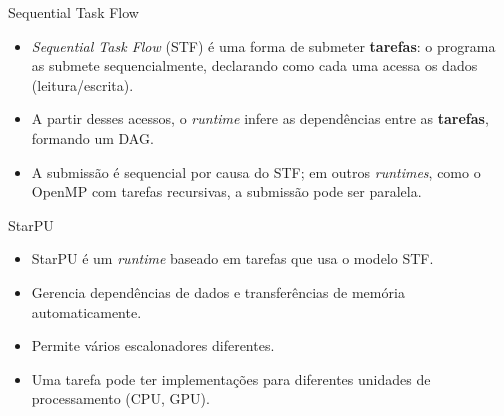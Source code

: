 \documentclass{beamer}
\begin{document}
\begin{frame}{Sequential Task Flow}
  \begin{itemize}
  \item<+-> \textit{Sequential Task Flow} (STF) é uma forma de submeter \textbf{tarefas}: o programa as submete sequencialmente, declarando como cada uma acessa os dados (leitura/escrita).
  \item<+-> A partir desses acessos, o \textit{runtime} infere as dependências entre as \textbf{tarefas}, formando um DAG.
  \item<+-> A submissão é sequencial por causa do STF; em outros \textit{runtimes}, como o OpenMP com tarefas recursivas, a submissão pode ser paralela.
  \end{itemize}
\end{frame}

\begin{frame}{StarPU}
  \begin{itemize}
  \item StarPU é um \textit{runtime} baseado em tarefas que usa o modelo STF.
  \item Gerencia dependências de dados e transferências de memória automaticamente.
  \item Permite vários escalonadores diferentes.
  \item Uma tarefa pode ter implementações para diferentes unidades de processamento (CPU, GPU).
  \end{itemize}
\end{frame}
\end{document}
